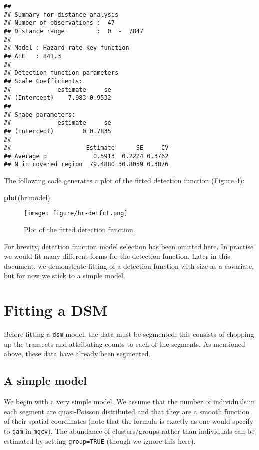 \documentclass[]{article}
\newenvironment{Shaded}{}{}
\newcommand{\KeywordTok}[1]{\textcolor[rgb]{0.00,0.44,0.13}{\textbf{{#1}}}}
\newcommand{\NormalTok}[1]{{#1}}
\begin{document}
\begin{verbatim}
## 
## Summary for distance analysis 
## Number of observations :  47 
## Distance range         :  0  -  7847 
## 
## Model : Hazard-rate key function 
## AIC   : 841.3 
## 
## Detection function parameters
## Scale Coefficients:  
##             estimate     se
## (Intercept)    7.983 0.9532
## 
## Shape parameters:  
##             estimate     se
## (Intercept)        0 0.7835
## 
##                     Estimate      SE     CV
## Average p             0.5913  0.2224 0.3762
## N in covered region  79.4880 30.8059 0.3876
\end{verbatim}

The following code generates a plot of the fitted detection function
(Figure 4):

\begin{Shaded}
\begin{Highlighting}[]
\KeywordTok{plot}\NormalTok{(hr.model)}
\end{Highlighting}
\end{Shaded}

\begin{figure}[htbp]
\centering
\texttt{[image: figure/hr-detfct.png]}
\caption{Plot of the fitted detection function.}
\end{figure}

For brevity, detection function model selection has been omitted here.
In practise we would fit many different forms for the detection
function. Later in this document, we demonstrate fitting of a detection
function with size as a covariate, but for now we stick to a simple
model.

\section{Fitting a DSM}\label{fitting-a-dsm}

Before fitting a \texttt{dsm} model, the data must be segmented; this
consists of chopping up the transects and attributing counts to each of
the segments. As mentioned above, these data have already been
segmented.

\subsection{A simple model}\label{a-simple-model}

We begin with a very simple model. We assume that the number of
individuals in each segment are quasi-Poisson distributed and that they
are a smooth function of their spatial coordinates (note that the
formula is exactly as one would specify to \texttt{gam} in
\texttt{mgcv}). The abundance of clusters/groups rather than individuals
can be estimated by setting \texttt{group=TRUE} (though we ignore this
here).
\end{document}
